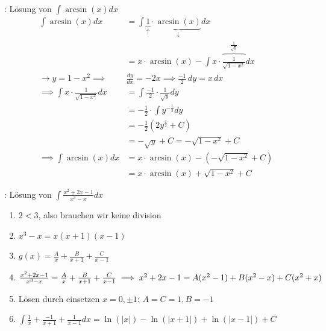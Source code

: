\begin{minipage}{\linewidth}
\Bsp {}: Lösung von $\displaystyle \int \arcsin(x) dx$
\vspace{-0.6em}
\begin{align*}
    \int \arcsin(x) dx &= \int \underbrace{1}_\uparrow \cdot \underbrace{\arcsin(x)}_\downarrow dx \\[-2.6em]
                       &= x \cdot \arcsin(x) - \int x \cdot \overbrace{\frac{1}{\sqrt{1-x^2}}}^{\frac{1}{\sqrt{y}}} dx \\
    \longrightarrow y = 1 - x^2 \implies& \frac{dy}{dx} = -2x \implies \frac{-1}{2} \, dy = x \, dx \\[-0.1em]
    \implies \int x \cdot \frac{1}{\sqrt{1-x^2}} dx &= \int \frac{-1}{2} \cdot \frac{1}{\sqrt{y}} dy \\[-0.1em]
                       &= -\frac{1}{2} \cdot \int y^{-\frac{1}{2}} dy \\[-0.3em]
                       &= -\frac{1}{2} (2y^{\frac{1}{2}} + C) \\[-0.3em]
                       &= -\sqrt{y} + C = -\sqrt{1-x^2} + C \\
    \implies \int \arcsin(x) dx &= x \cdot \arcsin(x) - (-\sqrt{1 - x^2} + C) \\[-0.8em]
                                &= x \cdot \arcsin(x) + \sqrt{1 - x^2} + C
\end{align*}
\end{minipage}

\Bsp {}: Lösung von $\displaystyle \int \frac{x^2 + 2x - 1}{x^3 - x} dx$
\vspace{-0.6em}
\begin{enumerate}
    \item $2 < 3$, also brauchen wir keine division
    \item $x^3 - x = x(x+1)(x-1)$
    \item $g(x) = \frac{A}{x} + \frac{B}{x + 1} + \frac{C}{x - 1}$
    \item $\frac{x^2 + 2x - 1}{x^3 - x} = \frac{A}{x} + \frac{B}{x + 1} + \frac{C}{x - 1} \\
    \implies x^2 + 2x -1 = A(x^2 - 1) + B(x^2 - x) + C(x^2 + x)$
    \item Lösen durch einsetzen $x = 0, \pm 1$: $A = C = 1, B = -1$
    \item $\displaystyle \int \frac{1}{x} + \frac{-1}{x+1} + \frac{1}{x-1} dx = \ln(|x|) - \ln(|x+1|) + \ln(|x-1|) + C$
\end{enumerate}

